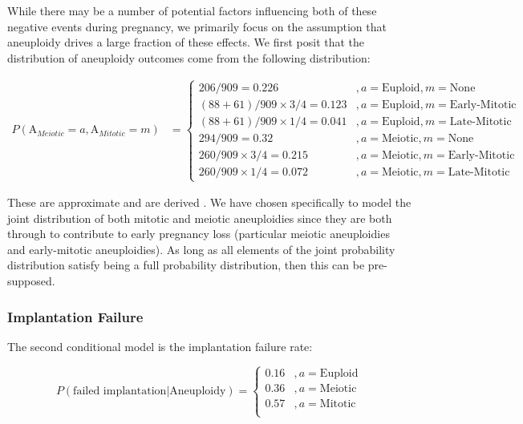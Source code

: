 \documentclass{article}
\begin{document}
While there may be a number of potential factors influencing both of these negative events during pregnancy, we primarily focus on the assumption that aneuploidy drives a large fraction of these effects. We first posit that the distribution of aneuploidy outcomes come from the following distribution: 

\begin{equation}
\begin{aligned}
P(\text{A}_{Meiotic} = a, \text{A}_{Mitotic} = m) &= \begin{cases}
206 / 909 = 0.226 &, a = \text{Euploid}, m = \text{None}\\
(88 + 61)/ 909 \times 3/4 = 0.123 &, a = \text{Euploid}, m = \text{Early-Mitotic}\\
(88 + 61)/ 909 \times 1/4 = 0.041 &, a = \text{Euploid}, m = \text{Late-Mitotic}\\
294 / 909 = 0.32 &, a = \text{Meiotic}, m = \text{None}\\
260 / 909 \times 3/4 = 0.215 &, a = \text{Meiotic}, m = \text{Early-Mitotic}\\
260 / 909 \times 1/4 = 0.072 &, a = \text{Meiotic}, m = \text{Late-Mitotic}
\end{cases}
\end{aligned}
\end{equation}

These are approximate and are derived \citep{McCoy2023-dg}. We have chosen specifically to model the joint distribution of both mitotic and meiotic aneuploidies since they are both through to contribute to early pregnancy loss (particular meiotic aneuploidies and early-mitotic aneuploidies). As long as all elements of the joint probability distribution satisfy being a full probability distribution, then this can be pre-supposed. 

\subsubsection*{Implantation Failure}

The second conditional model is the implantation failure rate: 

\begin{equation}
P(\text{failed implantation} | \text{Aneuploidy}) = \begin{cases}
0.16 &, a = \text{Euploid}\\
0.36 &, a = \text{Meiotic}\\
0.57 &, a = \text{Mitotic}\\
\end{cases}
\end{equation}
\end{document}
